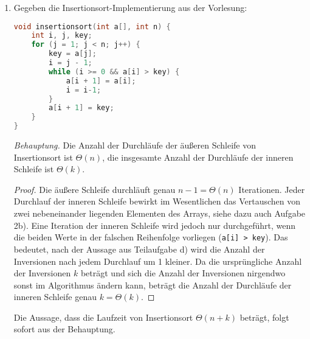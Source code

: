 \documentclass[11pt,a4paper]{article}
\begin{document}
\begin{loesung}
\begin{enumerate}
        \item
        Gegeben die Insertionsort-Implementierung aus der Vorlesung:
        \begin{lstlisting}[language=c++]
void insertionsort(int a[], int n) {
    int i, j, key;
    for (j = 1; j < n; j++) {
        key = a[j];
        i = j - 1; 
        while (i >= 0 && a[i] > key) { 
            a[i + 1] = a[i];
            i = i-1;
        }
        a[i + 1] = key;
    }
} 
        \end{lstlisting}
        \textit{Behauptung.} Die Anzahl der Durchläufe der äußeren Schleife von Insertionsort ist $\Theta(n)$, die insgesamte Anzahl der Durchläufe der inneren Schleife ist $\Theta(k)$.
        \begin{proof}
            Die äußere Schleife durchläuft genau $n - 1 = \Theta(n)$ Iterationen.
            Jeder Durchlauf der inneren Schleife bewirkt im Wesentlichen das Vertauschen von zwei nebeneinander liegenden Elementen des Arrays, siehe dazu auch Aufgabe 2b).
            Eine Iteration der inneren Schleife wird jedoch nur durchgeführt, wenn die beiden Werte in der falschen Reihenfolge vorliegen (\texttt{a[i] > key}).
            Das bedeutet, nach der Aussage aus Teilaufgabe d) wird die Anzahl der Inversionen nach jedem Durchlauf um 1 kleiner.
            Da die ursprüngliche Anzahl der Inversionen $k$ beträgt und sich die Anzahl der Inversionen nirgendwo sonst im Algorithmus ändern kann, beträgt die Anzahl der Durchläufe der inneren Schleife genau $k = \Theta(k)$.
        \end{proof}
        Die Aussage, dass die Laufzeit von Insertionsort $\Theta(n + k)$ beträgt, folgt sofort aus der Behauptung.




\end{enumerate}
\end{loesung}
\end{document}
